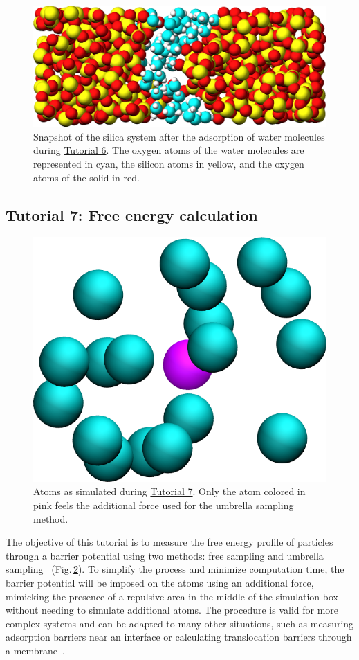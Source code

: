 \documentclass[9pt,tutorial]{livecoms}
\begin{document}
\begin{figure}
\centering
\includegraphics[width=\linewidth]{GCMC-solvated}
\caption{Snapshot of the silica system after the adsorption of water molecules
during \hyperref[gcmc-silica-label]{Tutorial 6}.
The oxygen atoms of the water molecules are represented in cyan, the silicon
atoms in yellow, and the oxygen atoms of the solid in red.}
\label{fig:GCMC-solvated}
\end{figure}

\subsection{Tutorial 7: Free energy calculation}
\label{umbrella-sampling-label}

\begin{figure}
\centering
\includegraphics[width=0.55\linewidth]{US}
\caption{Atoms as simulated during \hyperref[umbrella-sampling-label]{Tutorial 7}.
Only the atom colored in pink feels the additional force used for the umbrella
sampling method.}
\label{fig:US}
\end{figure}

\noindent The objective of this tutorial is to measure the free energy profile
of particles through a barrier potential using two methods: free sampling and
umbrella sampling~\cite{kastner2011umbrella, allen2017computer, frenkel2023understanding} (Fig.\,\ref{fig:US}).
To simplify the process and minimize computation time, the barrier potential will be
imposed on the atoms using an additional force, mimicking the presence of a repulsive
area in the middle of the simulation box without needing to simulate additional atoms.
The procedure is valid for more complex systems and can be adapted to many other
situations, such as measuring adsorption barriers near an interface or calculating
translocation barriers through a membrane~\cite{wilson1997adsorption, makarov2009computer,
gravelle2021adsorption, loche2022molecular, hayatifar2024probing}.
\end{document}
